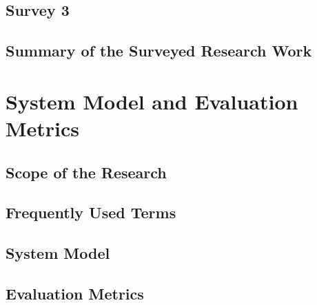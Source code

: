 \documentclass[10pt]{llncs}
\begin{document}
\subsection{Survey 3}






%
\subsection{Summary of the Surveyed Research Work}



%
\section{System Model and Evaluation Metrics}

%
\subsection{Scope of the Research}


%
\subsection{Frequently Used Terms}

%
\subsection{System Model}


%
\subsection{Evaluation Metrics}


%
\end{document}
